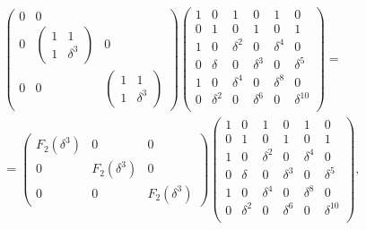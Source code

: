 \begin{multline*}
\begin{pmatrix}
        0
         &
        0
        \\
        0
         &
        \begin{pmatrix}
            1 & 1        \\
            1 & \delta^3
        \end{pmatrix}
         &
        0
        \\
        0
         &
        0
         &
        \begin{pmatrix}
            1 & 1        \\
            1 & \delta^3
        \end{pmatrix}
    \end{pmatrix}
    \begin{pmatrix}
        1 & 0        & 1        & 0        & 1        & 0           \\
        0 & 1        & 0        & 1        & 0        & 1           \\
        1 & 0        & \delta^2 & 0        & \delta^4 & 0           \\
        0 & \delta   & 0        & \delta^3 & 0        & \delta^5    \\
        1 & 0        & \delta^4 & 0        & \delta^8 & 0           \\
        0 & \delta^2 & 0        & \delta^6 & 0        & \delta^{10} \\
    \end{pmatrix} = \\
    =
    \begin{pmatrix}
        F_2(\delta^3) & 0             & 0             \\
        0             & F_2(\delta^3) & 0             \\
        0             & 0             & F_2(\delta^3)
    \end{pmatrix}
    \begin{pmatrix}
        1 & 0        & 1        & 0        & 1        & 0           \\
        0 & 1        & 0        & 1        & 0        & 1           \\
        1 & 0        & \delta^2 & 0        & \delta^4 & 0           \\
        0 & \delta   & 0        & \delta^3 & 0        & \delta^5    \\
        1 & 0        & \delta^4 & 0        & \delta^8 & 0           \\
        0 & \delta^2 & 0        & \delta^6 & 0        & \delta^{10} \\
    \end{pmatrix} ,
\end{multline*}
